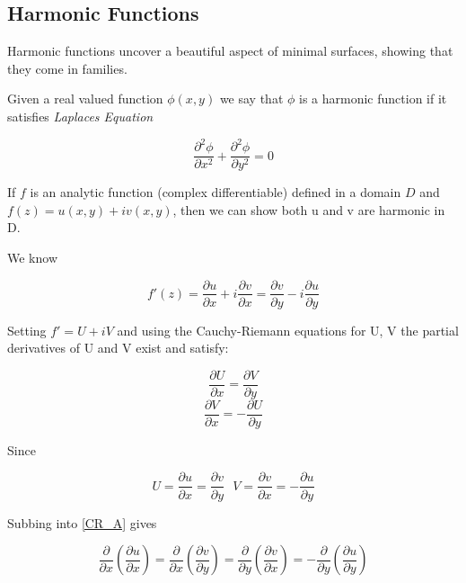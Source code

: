 \subsection{Harmonic Functions}
Harmonic functions uncover a beautiful aspect of minimal surfaces, showing that they come in families.

Given a real valued function $\phi(x,y)$ we say that $\phi$ is a harmonic function if it satisfies \emph{Laplaces Equation}

\begin{displaymath}
\frac{\partial^2 \phi}{\partial x^2} + \frac{\partial^2 \phi}{\partial y^2} = 0 
\end{displaymath}

If $f$ is an analytic function (complex differentiable) defined in a domain $D$ and $f(z) = u(x,y)+iv(x,y)$, then we can show both u and v are harmonic in D. 

We know

\begin{displaymath}
f'(z) = \frac{\partial u}{\partial x} + i \frac{\partial v}{\partial x} = \frac{\partial v}{\partial y} - i \frac{\partial u}{\partial y}
\end{displaymath}

Setting $f' = U +iV$ and using the Cauchy-Riemann equations for U, V the partial derivatives of U and V exist and satisfy:

\begin{equation}
\frac{\partial U}{\partial x} = \frac{\partial V}{\partial y}
\label{CR_A}
\end{equation}
\begin{equation}
\frac{\partial V}{\partial x} =  -\frac{\partial U}{\partial y}
\label{CR_B}
\end{equation}

Since

\begin{displaymath}
U = \frac{\partial u}{\partial x} = \frac{\partial v}{\partial y}\ \ \  V = \frac{\partial v}{\partial x} = -\frac{\partial u}{\partial y}
\end{displaymath}

Subbing into \ref{CR_A} gives 

\begin{displaymath}
\frac{\partial}{\partial x}(\frac{\partial u}{\partial x}) 
= \frac{\partial}{\partial x}(\frac{\partial v}{\partial y})
= \frac{\partial}{\partial y}(\frac{\partial v}{\partial x})
= -\frac{\partial}{\partial y}(\frac{\partial u}{\partial y})
\end{displaymath}

